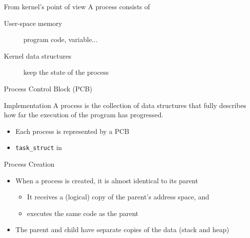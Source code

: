 \begin{frame}
  \begin{block}{From kernel's point of view}
    A process consists of
    \begin{description}
    \item[User-space memory] program code, variable...
    \item[Kernel data structures] keep the state of the process
    \end{description}
  \end{block}
\end{frame}

\begin{frame}{Process Control Block (PCB)}
  \begin{varwidth}{.7\textwidth}
    \begin{block}{Implementation}
        A process is \alert{the collection of data structures} that fully describes how far
        the execution of the program has progressed.
        \begin{itemize}
        \item Each process is represented by a \alert{PCB}
        \item \texttt{task\_struct} in \linux{}
        \end{itemize}
      \end{block}
    \end{varwidth}\quad
    \begin{varwidth}{.2\textwidth}
      \begin{center}
      \end{center}      
    \end{varwidth}
\end{frame}

\begin{frame}{Process Creation}
  \begin{center}
  \end{center}
  \begin{itemize}
  \item When a process is created, it is almost identical to its parent
    \begin{itemize}
    \item It receives a (logical) copy of the parent's address space, and
    \item executes the same code as the parent
    \end{itemize}
  \item The parent and child have separate copies of the data (stack and heap)
  \end{itemize}
\end{frame}

